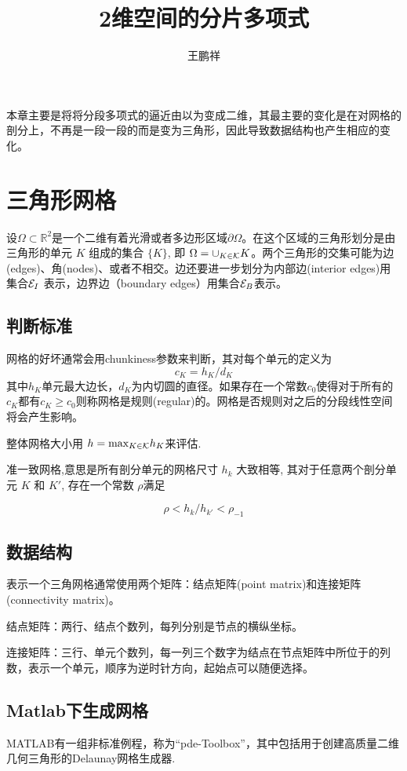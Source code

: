 \documentclass{article}
\begin{document}
\title{2维空间的分片多项式}
\author{王鹏祥}
\date{\chntoday}
\maketitle
\tableofcontents
\newpage

本章主要是将将分段多项式的逼近由以为变成二维，其最主要的变化是在对网格的剖分上，不再是一段一段的而是变为三角形，因此导致数据结构也产生相应的变化。
\section{三角形网格}
设$\Omega \subset \mathbb{R}^{2}$是一个二维有着光滑或者多边形区域$\partial \Omega$。在这个区域的三角形划分是由三角形的单元 $K$ 组成的集合 $\{K\}$, 即 $\Omega = \cup_{K\in{\mathcal K}}K$。两个三角形的交集可能为边(edges)、角(nodes)、或者不相交。边还要进一步划分为内部边(interior edges)用集合${\mathcal E}_I$ 表示，边界边（boundary edges）用集合${\mathcal E}_B$表示。
\subsection{判断标准}
网格的好坏通常会用chunkiness参数来判断，其对每个单元的定义为
$$
c_{K}=h_{K} / d_{K}
$$
其中$h_{K}$单元最大边长，$d_{K}$为内切圆的直径。如果存在一个常数$c_0$使得对于所有的$c_{K}$都有$c_{K} \geq c_{0}$则称网格是规则(regular)的。网格是否规则对之后的分段线性空间将会产生影响。

整体网格大小用 $h=\text{max}_{K\in{\mathcal K}}h_K$来评估.

准一致网格,意思是所有剖分单元的网格尺寸 $h_k$ 大致相等, 其对于任意两个剖分单元 $K$ 和 $K'$, 存在一个常数 $\rho$满足

$$
\rho<h_k/h_{k'}<\rho_{-1}
$$

\subsection{数据结构}
表示一个三角网格通常使用两个矩阵：结点矩阵(point matrix)和连接矩阵(connectivity matrix)。

结点矩阵：两行、结点个数列，每列分别是节点的横纵坐标。

连接矩阵：三行、单元个数列，每一列三个数字为结点在节点矩阵中所位于的列数，表示一个单元，顺序为逆时针方向，起始点可以随便选择。

\subsection{Matlab下生成网格}
MATLAB有一组非标准例程，称为“pde-Toolbox”，其中包括用于创建高质量二维几何三角形的Delaunay网格生成器.
\end{document}
